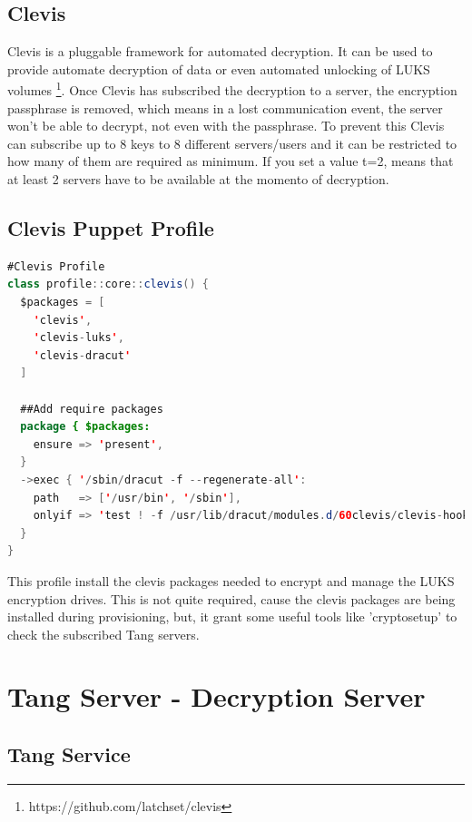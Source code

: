 \newpage
\subsection{Clevis}

Clevis is a pluggable framework for automated decryption. It can be used to provide automate decryption of data or even automated unlocking of LUKS volumes \footnote[2]{https://github.com/latchset/clevis}.
Once Clevis has subscribed the decryption to a server, the encryption passphrase is removed, which means in a lost communication event, the server won't be able to decrypt, not even with the passphrase. To prevent this Clevis can subscribe up to 8 keys to 8 different servers/users and it can be restricted to how many of them are required as minimum. If you set a value t=2, means that at least 2 servers have to be available at the momento of decryption.


\subsection{Clevis Puppet Profile}
\begin{lstlisting}[language=Java]
#Clevis Profile
class profile::core::clevis() {
  $packages = [
    'clevis',
    'clevis-luks',
    'clevis-dracut'
  ]

  ##Add require packages
  package { $packages:
    ensure => 'present',
  }
  ->exec { '/sbin/dracut -f --regenerate-all':
    path   => ['/usr/bin', '/sbin'],
    onlyif => 'test ! -f /usr/lib/dracut/modules.d/60clevis/clevis-hook.sh'
  }
}
\end{lstlisting}

This profile install the clevis packages needed to encrypt and manage the LUKS encryption drives. This is not quite required, cause the clevis packages are being installed during provisioning, but, it grant some useful tools like 'cryptosetup' to check the subscribed Tang servers.

\newpage
\section{Tang Server - Decryption Server}

\subsection{Tang Service}


